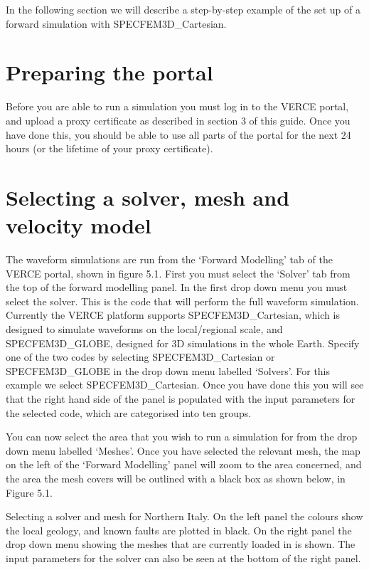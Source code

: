 \documentclass[english]{book}
\begin{document}
In the following section we will describe a step-by-step example of the
set up of a forward simulation with SPECFEM3D\_Cartesian.


\section{Preparing the portal}
\label{\detokenize{Section5:preparing-the-portal}}
Before you are able to run a simulation you must log in to the VERCE
portal, and upload a proxy certificate as described in section 3 of this
guide. Once you have done this, you should be able to use all parts of
the portal for the next 24 hours (or the lifetime of your proxy
certificate).


\section{Selecting a solver, mesh and velocity model}
\label{\detokenize{Section5:selecting-a-solver-mesh-and-velocity-model}}
The waveform simulations are run from the ‘Forward Modelling’ tab of the
VERCE portal, shown in figure 5.1. First you must select the ‘Solver’
tab from the top of the forward modelling panel. In the first drop down
menu you must select the solver. This is the code that will perform the
full waveform simulation. Currently the VERCE platform supports
SPECFEM3D\_Cartesian, which is designed to simulate waveforms on the
local/regional scale, and SPECFEM3D\_GLOBE, designed for 3D simulations
in the whole Earth. Specify one of the two codes by selecting
SPECFEM3D\_Cartesian or SPECFEM3D\_GLOBE in the drop down menu labelled
‘Solvers’. For this example we select SPECFEM3D\_Cartesian. Once you
have done this you will see that the right hand side of the panel is
populated with the input parameters for the selected code, which are
categorised into ten groups.

You can now select the area that you wish to run a simulation for from
the drop down menu labelled ‘Meshes’. Once you have selected the
relevant mesh, the map on the left of the ‘Forward Modelling’ panel will
zoom to the area concerned, and the area the mesh covers will be
outlined with a black box as shown below, in Figure 5.1.


 Selecting a solver and mesh for Northern Italy. On the
left panel the colours show the local geology, and known faults are
plotted in black. On the right panel the drop down menu showing the
meshes that are currently loaded in is shown. The input parameters for
the solver can also be seen at the bottom of the right panel.
\end{document}
